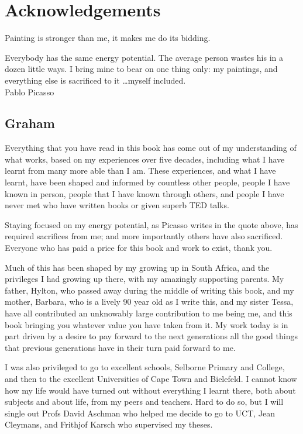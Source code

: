 ﻿\chapter{Acknowledgements}


\begin{chapterquotation}
Painting is stronger than me, it makes me do its bidding. \par  Everybody has the same energy potential. The average person wastes his in a dozen little ways. I bring mine to bear on one thing only: my paintings, and everything else is sacrificed to it \ldots myself included. \\
\raggedleft\textemdash Pablo Picasso
\end{chapterquotation}


\section*{Graham}
Everything that you have read in this book has come out of my understanding of what works, based on my experiences over five decades, including what I have learnt from many more able than I am. These experiences, and what I have learnt, have been shaped and informed by countless other people, people I have known in person, people that I have known through others, and people I have never met who have written books or given superb TED talks.


Staying focused on my energy potential, as Picasso writes in the quote above, has required sacrifices from me; and more importantly others have also sacrificed. Everyone who has paid a price for this book and work to exist, thank you. 


Much of this has been shaped by my growing up in South Africa, and the privileges I had growing up there, with my amazingly supporting parents. My father, Hylton, who passed away during the middle of writing this book, and my mother, Barbara, who is a lively 90 year old as I write this, and my sister Tessa, have all contributed an unknowably large contribution to me being me, and this book bringing you whatever value you have taken from it. My work today is in part driven by a desire to pay forward to the next generations all the good things that previous generations have in their turn paid forward to me. 


I was also privileged to go to excellent schools, Selborne Primary and College, and then to the  excellent Universities of Cape Town and Bielefeld. I cannot know how my life would have turned out without everything I learnt there, both about subjects and about life, from my peers and teachers. Hard to do so, but I will single out Profs David Aschman who helped me decide to go to UCT, Jean Cleymans, and Frithjof Karsch who supervised my theses. 



